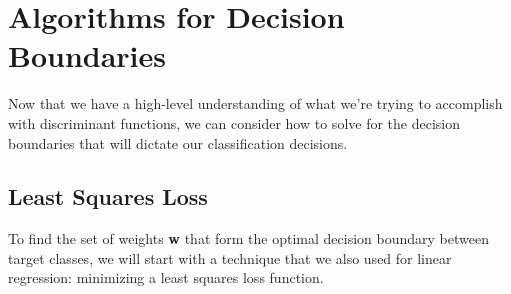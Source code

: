 
\section{Algorithms for Decision Boundaries}
Now that we have a high-level understanding of what we're trying to accomplish with discriminant functions, we can consider how to solve for the decision boundaries that will dictate our classification decisions.

\subsection{Least Squares Loss}
To find the set of weights \textbf{w} that form the optimal decision boundary between target classes, we will start with a technique that we also used for linear regression: minimizing a least squares loss function.

